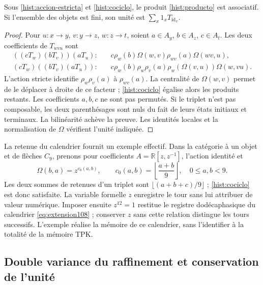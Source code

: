 \begin{proposition}
Sous \eqref{hist:accion-estricta} et \eqref{hist:cociclo}, le produit
\eqref{hist:producto} est associatif. Si l’ensemble des objets est fini,
son unité est \(\sum_x1_xT_{\operatorname{id}_x}\).
\end{proposition}
\begin{proof}
Pour \(u:x\to y\), \(v:y\to z\), \(w:z\to t\), soient
\(a\in A_y\), \(b\in A_z\), \(c\in A_t\). Les deux coefficients
de \(T_{wvu}\) sont
\begin{align*}
 ((cT_w)(bT_v))(aT_u):\quad&
 c\rho_w(b)\Omega(w,v)\rho_{wv}(a)\Omega(wv,u),\\
 (cT_w)((bT_v)(aT_u)):\quad&
 c\rho_w(b)\rho_w\rho_v(a)\rho_w(\Omega(v,u))\Omega(w,vu).
\end{align*}
L’action stricte identifie \(\rho_w\rho_v(a)\) à \(\rho_{wv}(a)\).
La centralité de \(\Omega(w,v)\) permet de le déplacer à droite de
ce facteur ; \eqref{hist:cociclo} égalise alors les produits restants.
Les coefficients \(a,b,c\) ne sont pas permutés. Si le triplet n’est pas composable,
les deux parenthésages sont nuls du fait de leurs états initiaux et terminaux.
La bilinéarité achève la preuve. Les identités locales et la
normalisation de \(\Omega\) vérifient l’unité indiquée.
\end{proof}

La retenue du calendrier fournit un exemple effectif. Dans la catégorie
à un objet et de flèches \(C_9\), prenons pour coefficients
\(A=\mathbb R[z,z^{-1}]\), l’action identité et
\[
 \Omega(b,a)=z^{c_0(a,b)},\qquad
 c_0(a,b)=\left\lfloor\frac{a+b}{9}\right\rfloor,
 \quad 0\leq a,b<9.
\]
Les deux sommes de retenues d’un triplet sont
\(\lfloor(a+b+c)/9\rfloor\) ; \eqref{hist:cociclo}
est donc satisfaite. La variable formelle \(z\) enregistre le tour sans
lui attribuer de valeur numérique. Imposer ensuite \(z^{12}=1\) restitue le
registre dodécaphasique du calendrier \eqref{eq:extension108} ; conserver
\(z\) sans cette relation distingue les tours successifs. L’exemple réalise
la mémoire de ce calendrier, sans l’identifier à la totalité de la
mémoire TPK.

\subsection{Double variance du raffinement et conservation de l’unité}
\label{hist:doble-varianza}

